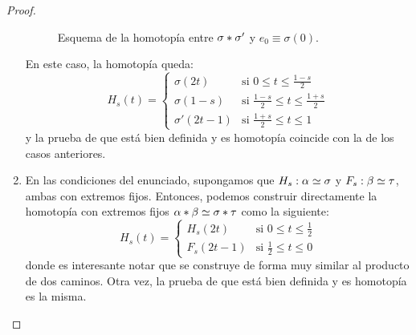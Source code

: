 \begin{lem}
\begin{proof}
\begin{enumerate}
\begin{figure}[h!]
				
				\caption{Esquema de la homotopía entre $\sigma\mathbin{*}\sigma'$ y $e_0\equiv\sigma(0)$.}
			\end{figure}
		
			En este caso, la homotopía queda:
			\[H_s(t)=\left\{\begin{array}{ll}
			\sigma(2t) & \text{si } 0\leq t\leq\frac{1-s}{2} \\
			\sigma(1-s) & \text{si } \frac{1-s}{2}\leq t\leq\frac{1+s}{2} \\
			\sigma'(2t-1) & \text{si } \frac{1+s}{2}\leq t\leq 1
			\end{array}\right.\]
			y la prueba de que está bien definida y es homotopía coincide con la de los casos anteriores.
			
			\item En las condiciones del enunciado, supongamos que $H_s:\alpha\mathrel{\smash{\underset{}{\simeq}}}\sigma$ y $F_s:\beta\mathrel{\smash{\underset{}{\simeq}}}\tau$, ambas con extremos fijos. Entonces, podemos construir directamente la homotopía con extremos fijos $\alpha\mathbin{*}\beta\mathrel{\smash{\underset{}{\simeq}}}\sigma\mathbin{*}\tau$ como la siguiente:
			\[H_s(t)=\left\{\begin{array}{ll}
			H_s(2t) & \text{si } 0\leq t\leq\frac{1}{2} \\
			F_s(2t - 1) & \text{si } \frac{1}{2}\leq t\leq 0
			\end{array}\right.\]
			donde es interesante notar que se construye de forma muy similar al producto de dos caminos. Otra vez, la prueba de que está bien definida y es homotopía es la misma. \qedhere
		\end{enumerate}
	\end{proof}
\end{lem}

